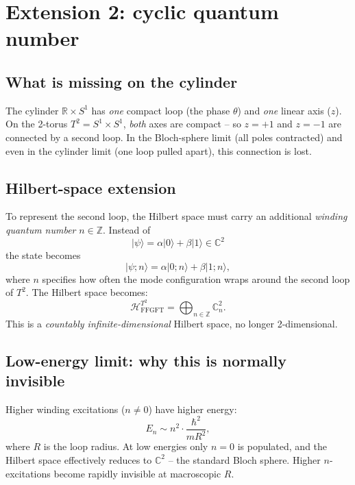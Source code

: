 \section{Extension 2: cyclic quantum number}

\subsection{What is missing on the cylinder}

The cylinder $\mathbb{R} \times S^1$ has \emph{one} compact loop
(the phase $\theta$) and \emph{one} linear axis ($z$). On the
2-torus $T^2 = S^1 \times S^1$, \emph{both} axes are compact -- so
$z = +1$ and $z = -1$ are connected by a second loop. In the
Bloch-sphere limit (all poles contracted) and even in the cylinder
limit (one loop pulled apart), this connection is lost.

\subsection{Hilbert-space extension}

To represent the second loop, the Hilbert space must carry an
additional \emph{winding quantum number} $n \in \mathbb{Z}$. Instead
of
\begin{equation}
  |\psi\rangle = \alpha|0\rangle + \beta|1\rangle \in \mathbb{C}^2
\end{equation}
the state becomes
\begin{equation}
  |\psi; n\rangle = \alpha|0; n\rangle + \beta|1; n\rangle,
\end{equation}
where $n$ specifies how often the mode configuration wraps around
the second loop of $T^2$. The Hilbert space becomes:
\begin{equation}
  \boxed{
    \mathcal{H}^{T^2}_{\text{FFGFT}}
    = \bigoplus_{n \in \mathbb{Z}} \mathbb{C}^2_n.
  }
\end{equation}
This is a \emph{countably infinite-dimensional} Hilbert space, no
longer 2-dimensional.

\subsection{Low-energy limit: why this is normally invisible}

Higher winding excitations ($n \neq 0$) have higher energy:
\begin{equation}
  E_n \sim n^2 \cdot \frac{\hbar^2}{m R^2},
\end{equation}
where $R$ is the loop radius. At low energies only $n = 0$ is
populated, and the Hilbert space effectively reduces to $\mathbb{C}^2$
-- the standard Bloch sphere. Higher $n$-excitations become
rapidly invisible at macroscopic $R$.

